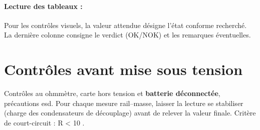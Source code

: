 \paragraph{Lecture des tableaux : }
Pour les contrôles visuels, la valeur attendue désigne l'état conforme
recherché. La dernière colonne consigne le verdict (OK/NOK) et les remarques éventuelles.

\clearpage



\section{Contrôles avant mise sous tension}

Contrôles au ohmmètre, carte hors tension et \textbf{batterie déconnectée}, précautions \gls{esd}.
Pour chaque mesure rail–masse, laisser la lecture se stabiliser (charge des condensateurs de découplage)
avant de relever la valeur finale. Critère de court-circuit : R < 10 \Omega.

